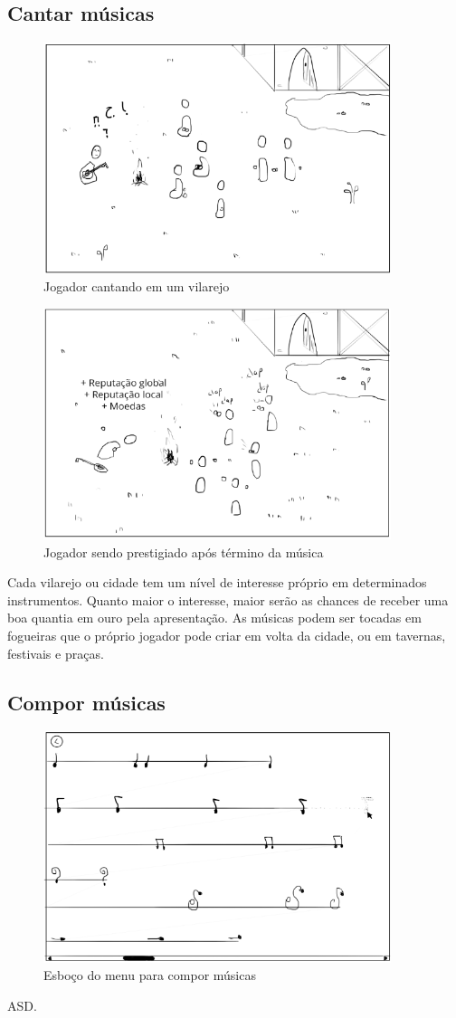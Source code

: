 \documentclass[12pt, 
openright, 
oneside, 
a4paper,    
brazil]{facom-ufu-abntex2}
\begin{document}
\subsection{Cantar músicas}
\begin{figure}[H]
	\centering
	\includegraphics[width=4in]{imagens/mecanica_cantar.png}
	\caption{Jogador cantando em um vilarejo}
\end{figure}
\begin{figure}[H]
	\centering
	\includegraphics[width=4in]{imagens/mecanica_cantar2.png}
	\caption{Jogador sendo prestigiado após término da música}
\end{figure}
Cada vilarejo ou cidade tem um nível de interesse próprio em determinados instrumentos.
Quanto maior o interesse, maior serão as chances de receber uma boa quantia em ouro
pela apresentação.
As músicas podem ser tocadas em fogueiras que o próprio jogador pode criar em volta da cidade, ou em tavernas, festivais e praças.
\subsection{Compor músicas}
\begin{figure}[H]
	\centering
	\includegraphics[width=4in]{imagens/mecanica_compormusica.png}
	\caption{Esboço do menu para compor músicas}
\end{figure}
ASD.
\end{document}
